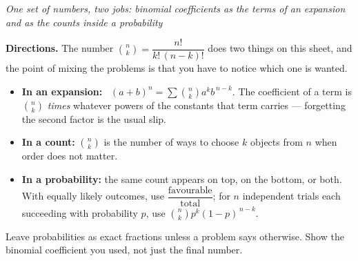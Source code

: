 \documentclass[12pt]{article}
\begin{document}

\begin{center}
\textit{One set of numbers, two jobs: binomial coefficients as the terms of an
expansion and as the counts inside a probability}
\end{center}

\noindent\textbf{Directions.} The number $\binom{n}{k} = \dfrac{n!}{k!\,(n-k)!}$
does two things on this sheet, and the point of mixing the problems is that you
have to notice which one is wanted.

\begin{itemize}[leftmargin=1.2cm, itemsep=2pt, topsep=3pt]
\item \textbf{In an expansion:} \ $(a + b)^n = \sum \binom{n}{k} a^k b^{\,n-k}$.
The coefficient of a term is $\binom{n}{k}$ \emph{times} whatever powers of the
constants that term carries --- forgetting the second factor is the usual slip.
\item \textbf{In a count:} $\binom{n}{k}$ is the number of ways to choose $k$
objects from $n$ when order does not matter.
\item \textbf{In a probability:} the same count appears on top, on the bottom,
or both. With equally likely outcomes, use $\dfrac{\text{favourable}}{\text{total}}$;
for $n$ independent trials each succeeding with probability $p$, use
$\binom{n}{k}p^k(1-p)^{\,n-k}$.
\end{itemize}

\vspace{0.1cm}
\noindent Leave probabilities as exact fractions unless a problem says
otherwise. Show the binomial coefficient you used, not just the final number.



\end{document}
